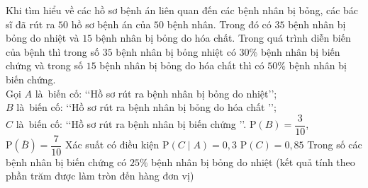 \begin{ex}%
	Khi tìm hiểu về các hồ sơ bệnh án liên quan đến  các bệnh nhân bị bỏng, các bác sĩ đã rút ra $50$ hồ sơ bệnh án của $50$ bệnh nhân. Trong đó có $35$ bệnh nhân bị bỏng do nhiệt và $15$ bệnh nhân bị bỏng do hóa chất. Trong quá trình diễn biến của bệnh thì trong số $35$ bệnh nhân bị bỏng nhiệt có $30\%$ bệnh nhân bị biến chứng và trong số $15$ bệnh nhân bị bỏng do hóa chất thì có $50\%$ bệnh nhân bị biến chứng.\\
	Gọi $A$ là~biến cố: \lq \lq Hồ sơ rút  ra bệnh nhân bị bỏng do nhiệt\rq\rq;\\
	$B$ là~biến cố: \lq\lq Hồ sơ rút ra  bệnh nhân bị bỏng do hóa chất \rq\rq;\\
	 $C$ là~biến cố: \lq\lq Hồ sơ rút ra bệnh nhân bị biến chứng \rq\rq.
	\choiceTF 
		 {\True $\mathrm{P}(B) = \dfrac{3}{10}$, $\mathrm{P}(\overline{B}) = \dfrac{7}{10}$}
		{\True Xác suất có  điều kiện $\mathrm{P}(C\mid A)=0{,}3 $}
		{$\mathrm{P}(C) = 0{,}85$} 
		{Trong số các bệnh nhân bị biến chứng có $25\%$ bệnh nhân bị bỏng do nhiệt (kết quả tính theo phần trăm được làm tròn đến hàng đơn  vị)}
\end{ex}

